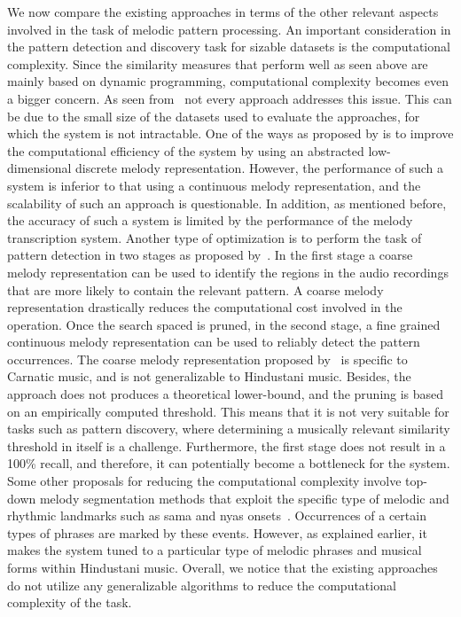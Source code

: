 {We now compare the existing approaches in terms of the other relevant aspects involved in the task of melodic pattern processing. An important consideration in the pattern detection and discovery task for sizable datasets is the computational complexity. Since the similarity measures that perform well as seen above are mainly based on dynamic programming, computational complexity becomes even a bigger concern. As seen from~ not every approach addresses this issue. This can be due to the small size of the datasets used to evaluate the approaches, for which the system is not intractable. One of the ways as proposed by \cite{ganguli2015efficient} is to improve the computational efficiency of the system by using an abstracted low-dimensional discrete melody representation. However, the performance of such a system is inferior to that using a continuous melody representation, and the scalability of such an approach is questionable. In addition, as mentioned before, the accuracy of such a system is limited by the performance of the melody transcription system. Another type of optimization is to perform the task of pattern detection in two stages as proposed by~\cite{dutta2014modified,Ishwar2013}. In the first stage a coarse melody representation can be used to identify the regions in the audio recordings that are more likely to contain the relevant pattern. A coarse melody representation drastically reduces the computational cost involved in the operation. Once the search spaced is pruned, in the second stage, a fine grained continuous melody representation can be used to reliably detect the pattern occurrences. The coarse melody representation proposed by~\cite{Ishwar2013} is specific to Carnatic music, and is not generalizable to Hindustani music. Besides, the approach does not produces a theoretical lower-bound, and the pruning is based on an empirically computed threshold. This means that it is not very suitable for tasks such as pattern discovery, where determining a musically relevant similarity threshold in itself is a challenge. Furthermore, the first stage does not result in a 100\% recall, and therefore, it can potentially become a bottleneck for the system. Some other proposals for reducing the computational complexity involve top-down melody segmentation methods that exploit the specific type of melodic and rhythmic landmarks such as \gls{sama} and \gls{nyas} onsets~\cite{Ross2012,Ross2012b}. Occurrences of a certain types of phrases are marked by these events. However, as explained earlier, it makes the system tuned to a particular type of melodic phrases and musical forms within Hindustani music. Overall, we notice that the existing approaches do not utilize any generalizable algorithms to reduce the computational complexity of the task. 

}
